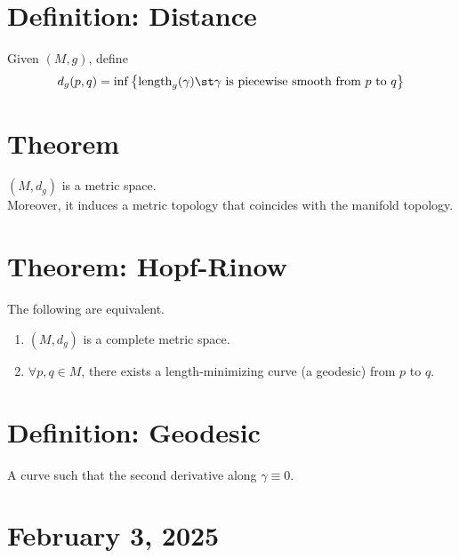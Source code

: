 \documentclass[11pt]{article}
\begin{document}
\section*{Definition: Distance}
\label{sec:org377f39c}
Given \((M,g)\), define\\
\begin{align*}
  d_{g}(p,q)
  =\inf\left\{ \operatorname{length}_{g}(\gamma)\st\gamma\text{ is piecewise smooth from }p\text{ to }q \right\}
\end{align*}
\section*{Theorem}
\label{sec:org5208c7e}
\((M,d_{g})\) is a metric space.\\
Moreover, it induces a metric topology that coincides with the manifold topology.\\
\section*{Theorem: Hopf-Rinow}
\label{sec:orgb675d6d}
The following are equivalent.\\
\begin{enumerate}
\item \((M,d_{g})\) is a complete metric space.\\
\item \(\forall p,q\in M\), there exists a length-minimizing curve (a geodesic) from \(p\) to \(q\).\\
\end{enumerate}
\section*{Definition: Geodesic}
\label{sec:orgb9956d3}
A curve such that the second derivative along \(\gamma\equiv 0\).\\
\section*{February 3, 2025}
\label{sec:orgeb212f0}
\end{document}
